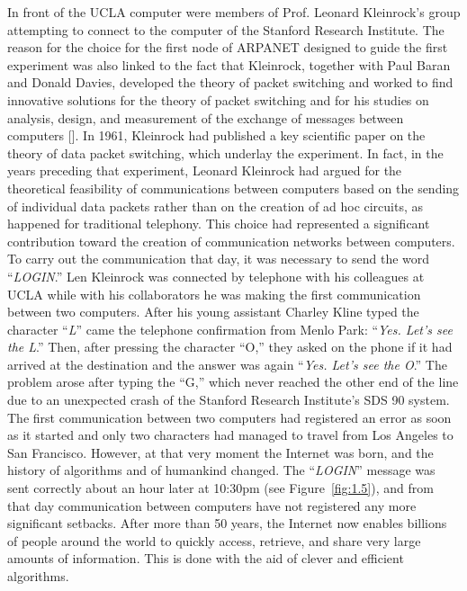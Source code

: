 {{{In front of the UCLA computer were members of Prof. Leonard Kleinrock's group attempting to connect to the computer of the Stanford Research Institute. The reason for the choice for the first node of ARPANET designed to guide the first experiment was also linked to the fact that Kleinrock, together with Paul Baran and Donald Davies, developed the theory of packet switching and worked to find innovative solutions for the theory of packet switching and for his studies on analysis, design, and measurement of the exchange of messages between computers [\citealt{chap:01:Abbate:2000}]. In 1961,  Kleinrock had published a key scientific paper on the theory of data packet switching, which underlay the experiment. In fact, in the years preceding that experiment, Leonard Kleinrock had argued for the theoretical feasibility of communications between computers based on the sending of individual data packets rather than on the creation of ad hoc circuits, as happened for traditional telephony. This choice had represented a significant contribution toward the creation of communication networks between computers. To carry out the communication that day, it was necessary to send the word ``\textit{LOGIN}.'' Len Kleinrock was connected by telephone with his colleagues at UCLA while with his collaborators he was making the first communication between two computers. After his young assistant Charley Kline typed the character ``\textit{L}'' came the telephone confirmation from Menlo Park: ``\textit{Yes. Let's see the L}.'' Then, after pressing the character ``O,'' they asked on the phone if it had arrived at the destination and the answer was again ``\textit{Yes. Let's see the O}.'' The problem arose after typing the ``G,'' which never reached the other end of the line due to an unexpected crash of the Stanford Research Institute's SDS 90 system. The first communication between two computers had registered an error as soon as it started and only two characters had managed to travel from Los Angeles to San Francisco. However, at that very moment the Internet was born, and the history of algorithms and of humankind changed. The ``\textit{LOGIN}'' message was sent correctly about an hour later at 10:30pm (see Figure~\ref{fig:1.5}), and from that day communication between computers have not registered any more significant setbacks. After more than 50 years, the Internet now enables billions of people around the world to quickly access, retrieve, and share very large amounts of information. This is done with the aid of clever and efficient algorithms.

}}}

